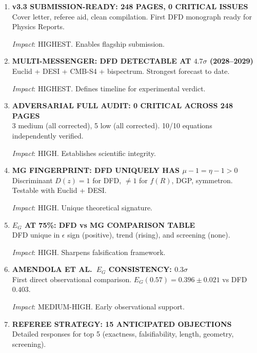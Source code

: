 \documentclass[11pt,a4paper]{article}
\begin{document}
\begin{enumerate}[label=\textbf{\arabic*.}, leftmargin=1.5cm]

\item \textbf{v3.3 SUBMISSION-READY: 248 PAGES, 0 CRITICAL ISSUES}\\
Cover letter, referee aid, clean compilation. First DFD monograph ready for Physics Reports.

\textit{Impact}: HIGHEST. Enables flagship submission.

\item \textbf{MULTI-MESSENGER: DFD DETECTABLE AT $4.7\sigma$ (2028--2029)}\\
Euclid + DESI + CMB-S4 + bispectrum. Strongest forecast to date.

\textit{Impact}: HIGHEST. Defines timeline for experimental verdict.

\item \textbf{ADVERSARIAL FULL AUDIT: 0 CRITICAL ACROSS 248 PAGES}\\
3 medium (all corrected), 5 low (all corrected). 10/10 equations independently verified.

\textit{Impact}: HIGH. Establishes scientific integrity.

\item \textbf{MG FINGERPRINT: DFD UNIQUELY HAS $\mu - 1 = \eta - 1 > 0$}\\
Discriminant $D(z) = 1$ for DFD, $\neq 1$ for $f(R)$, DGP, symmetron. Testable with Euclid + DESI.

\textit{Impact}: HIGH. Unique theoretical signature.

\item \textbf{$E_G$ AT 75\%: DFD vs MG COMPARISON TABLE}\\
DFD unique in $\epsilon$ sign (positive), trend (rising), and screening (none).

\textit{Impact}: HIGH. Sharpens falsification framework.

\item \textbf{AMENDOLA ET AL.\ $E_G$ CONSISTENCY: $0.3\sigma$}\\
First direct observational comparison. $E_G(0.57) = 0.396 \pm 0.021$ vs DFD $0.403$.

\textit{Impact}: MEDIUM-HIGH. Early observational support.

\item \textbf{REFEREE STRATEGY: 15 ANTICIPATED OBJECTIONS}\\
Detailed responses for top 5 (exactness, falsifiability, length, geometry, screening).


\end{enumerate}
\end{document}
